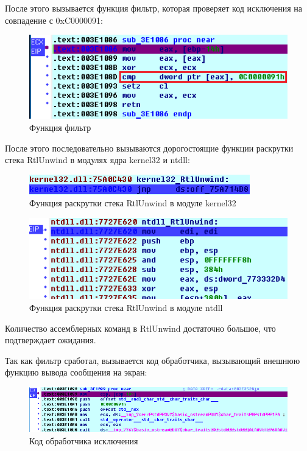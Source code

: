 \documentclass[14pt,a4paper,report]{report}
\begin{document}
После этого вызывается функция фильтр, которая проверяет код исключения на совпадение с 0xC0000091:

\begin{figure}[h!]
	\centering
	\includegraphics[scale = 0.75]{images/1_d3.png}
	\caption{Функция фильтр}
\end{figure}

После этого последовательно вызываются дорогостоящие функции раскрутки стека RtlUnwind в модулях ядра kernel32 и ntdll:

\begin{figure}[h!]
	\centering
	\includegraphics[scale = 0.95]{images/1_d5.png}
	\caption{Функция раскрутки стека RtlUnwind в модуле kernel32}
\end{figure}

\begin{figure}[h!]
	\centering
	\includegraphics[scale = 0.75]{images/1_d6.png}
	\caption{Функция раскрутки стека RtlUnwind в модуле ntdll}
\end{figure}

Количество ассемблерных команд в RtlUnwind достаточно большое, что подтверждает ожидания. 

Так как фильтр сработал, вызывается код обработчика, вызывающий внешнюю функцию вывода сообщения на экран:

\begin{figure}[h!]
	\centering
	\includegraphics[scale = 0.75]{images/1_d4.png}
	\caption{Код обработчика исключения}
\end{figure}
\end{document}
